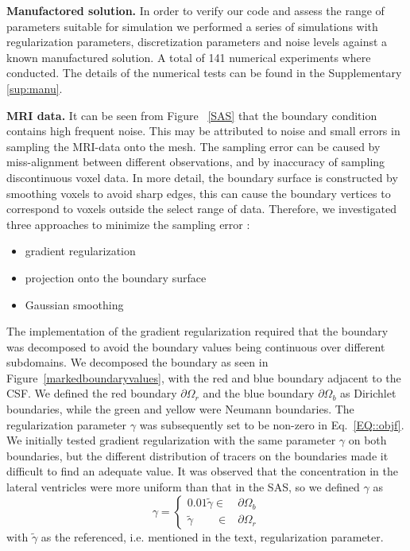 \documentclass[12pt,a4paper]{article}
\begin{document}
\textbf{Manufactored solution.}
In order to verify our code and assess the range of parameters suitable for simulation we performed a series of 
simulations with regularization parameters, discretization parameters and noise levels against a known manufactured solution. A total of 141 numerical experiments
where conducted. The details of the numerical tests can be found in the Supplementary \ref{sup:manu}.  

\textbf{MRI data.}
It can be seen from Figure ~\ref{SAS} that the boundary condition contains high frequent noise. This may be attributed to noise and small errors in sampling the MRI-data onto the mesh. The sampling error can be caused by miss-alignment between different observations, and by inaccuracy of sampling discontinuous voxel data. In more detail, the boundary surface is constructed by smoothing voxels to avoid sharp edges, this can cause the boundary vertices to correspond to voxels outside the select range of data. Therefore, we investigated three approaches to minimize the sampling error : 
\begin{itemize}
\item gradient regularization 
\item projection onto the boundary surface
\item Gaussian smoothing 
\end{itemize} 
 
The implementation of the gradient regularization required that the boundary was decomposed to avoid the boundary values being continuous over different subdomains. We decomposed the boundary as seen in Figure~\ref{markedboundaryvalues}, with the red and blue boundary adjacent to the CSF. We defined the red boundary $\partial \Omega_r$ and the blue boundary $\partial \Omega_b$ as Dirichlet boundaries, while the green and yellow were Neumann boundaries. The regularization parameter $\gamma$ was subsequently set to be non-zero in Eq.~\ref{EQ::objf}. We initially tested gradient regularization with the same parameter $\gamma$ on both boundaries, but the different distribution of tracers on the boundaries made it difficult to find an adequate value. It was observed that the concentration in the lateral ventricles were more uniform than that in the SAS, so we defined $\gamma$ as
\begin{equation}
\gamma = \begin{cases}
0.01\tilde{\gamma}  \in &\partial \Omega_{b} \\ 
\tilde{\gamma} \qquad \in  &\partial \Omega_{r}
\end{cases}  
\end{equation} 
with $\tilde{\gamma}$ as the referenced, i.e. mentioned in the text, regularization parameter.
\end{document}
